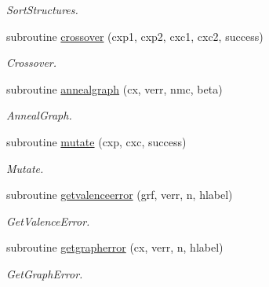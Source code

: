 \begin{DoxyCompactItemize}
\begin{DoxyCompactList}\small\item\em Sort\+Structures. \end{DoxyCompactList}\item 
subroutine \mbox{\hyperlink{namespacemoleculeopt_a5d8b857653669446c74c9cf8ed5c967c}{crossover}} (cxp1, cxp2, cxc1, cxc2, success)
\begin{DoxyCompactList}\small\item\em Crossover. \end{DoxyCompactList}\item 
subroutine \mbox{\hyperlink{namespacemoleculeopt_a67034fd87b4f496aa1bde12b85dcce96}{annealgraph}} (cx, verr, nmc, beta)
\begin{DoxyCompactList}\small\item\em Anneal\+Graph. \end{DoxyCompactList}\item 
subroutine \mbox{\hyperlink{namespacemoleculeopt_a112aaf632abf4b6e00b4a17247145342}{mutate}} (cxp, cxc, success)
\begin{DoxyCompactList}\small\item\em Mutate. \end{DoxyCompactList}\item 
subroutine \mbox{\hyperlink{namespacemoleculeopt_a280e267a5ce24d0ef0f1d90cafeef35a}{getvalenceerror}} (grf, verr, n, hlabel)
\begin{DoxyCompactList}\small\item\em Get\+Valence\+Error. \end{DoxyCompactList}\item 
subroutine \mbox{\hyperlink{namespacemoleculeopt_ab9da6f6b497ab4befdca8b3ee35b4730}{getgrapherror}} (cx, verr, n, hlabel)
\begin{DoxyCompactList}\small\item\em Get\+Graph\+Error. \end{DoxyCompactList}\end{DoxyCompactItemize}
